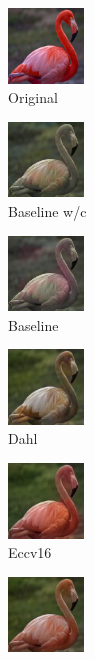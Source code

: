 \begin{figure}[t]
	\vspace{0.1cm}
	\begin{subfigure}[b]{0.1\textwidth}
		\centering
		\includegraphics[width=2cm]{or - flamingo.jpg}
		\caption{Original}
	\end{subfigure}
	\hfill
	\begin{subfigure}[b]{0.1\textwidth}
		\includegraphics[width=2cm]{bw - flamingo.jpg}
		\caption{Baseline w/c}
	\end{subfigure}
	\hfill
	\begin{subfigure}[b]{0.1\textwidth}
		\includegraphics[width=2cm]{b - flamingo.jpg}
		\caption{Baseline}
	\end{subfigure}
	\hfill
	\begin{subfigure}[b]{0.1\textwidth}
		\includegraphics[width=2cm]{d - flamingo.jpg}
		\caption{Dahl}
	\end{subfigure}
	\hfill
	\begin{subfigure}[b]{0.1\textwidth}
		\includegraphics[width=2cm]{z - flamingo.jpg}
		\caption{Eccv16}
	\end{subfigure}
	\hfill
	\begin{subfigure}[b]{0.1\textwidth}
		\includegraphics[width=2cm]{si- flamingo.jpg}

\end{subfigure}
\end{figure}

